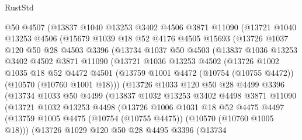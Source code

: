 \begin{lexlean}{RustStd}
\begin{coremodule}
      @50
      @4507
      (@13837
        @1040
        @13253
        @3402
        @4506
        @3871
        @11090
        (@13721
          @1040
          @13253
          @4506
          (@15679
            @1039
            @18
            @52
            @4176
            @4505
            @15693
            (@13726
              @1037
              @120
              @50
              @28
              @4503
              @3396
              (@13734
                @1037
                @50
                @4503
                (@13837
                  @1036
                  @13253
                  @3402
                  @4502
                  @3871
                  @11090
                  (@13721
                    @1036
                    @13253
                    @4502
                    (@13726
                      @1002
                      @1035
                      @18
                      @52
                      @4472
                      @4501
                      (@13759 @1001 @4472 (@10754 (@10755 @4472)) (@10570 (@10760 @1001 @18)))
                      (@13726
                        @1033
                        @120
                        @50
                        @28
                        @4499
                        @3396
                        (@13734
                          @1033
                          @50
                          @4499
                          (@13837
                            @1032
                            @13253
                            @3402
                            @4498
                            @3871
                            @11090
                            (@13721
                              @1032
                              @13253
                              @4498
                              (@13726
                                @1006
                                @1031
                                @18
                                @52
                                @4475
                                @4497
                                (@13759
                                  @1005
                                  @4475
                                  (@10754 (@10755 @4475))
                                  (@10570 (@10760 @1005 @18)))
                                (@13726
                                  @1029
                                  @120
                                  @50
                                  @28
                                  @4495
                                  @3396
                                  (@13734

\end{coremodule}
\end{lexlean}
